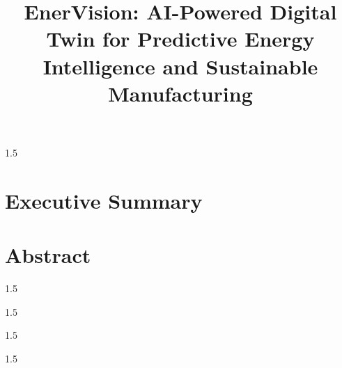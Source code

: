\documentclass[12pt,oneside,a4paper]{book} %
\title{EnerVision: AI-Powered Digital Twin for Predictive Energy Intelligence and Sustainable Manufacturing}
\begin{document}
\NoBgThispage%
\maketitle
\newpage
\ifDrf
\else
\begin{spacing}{1.5}

\ifINT
\else
\newpage

\fi
\newpage
\ifINT

\else

\fi
\newpage
{}
\ifINT
\chapter*{Executive Summary}

\else
\chapter*{Abstract}

\fi

\end{spacing}
\newpage
\pagestyle{fplain}
\begin{spacing}{1.5}
	\tableofcontents	
\end{spacing}
\begin{spacing}{1.5}\clearpage{}
	\listoffigures	
\end{spacing}
\begin{spacing}{1.5}\clearpage{}
	\listoftables	
\end{spacing}
\fi
\mainmatter
\pagestyle{mplain}
\glsresetall
\begin{spacing}{1.5}
\ifINT
% 
\else

\fi

\ifINT

\else

\fi

\ifINT
%
\else

\fi

\ifINT
%
\else

\fi

\ifINT
\else

\fi

\ifINT
\else

\fi

\appendix

\backmatter
\ifDrf
\else
\clearpage
{}
\printbibliography%
\fi
\end{spacing}
\end{document}
